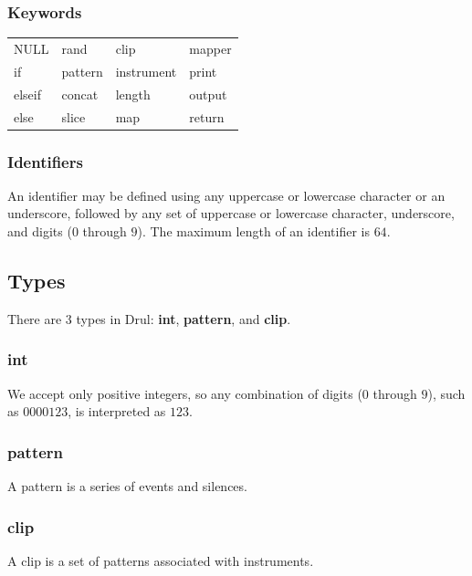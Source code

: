 \documentclass[11pt,twoside]{article}
\begin{document}
\subsubsection{Keywords}


\begin{table}[htb]
\begin{center} 
\begin{tabular}{llll} 
  NULL &    rand &    clip &        mapper \\
  if &      pattern & instrument &  print \\
  elseif &  concat &  length &      output \\
  else &    slice &   map &         return
\end{tabular}
\label{tab:keywords}
\end{center} 
\end{table}


\subsubsection{Identifiers}
An identifier may be defined using any uppercase or lowercase character
or an underscore, followed by any set of uppercase or lowercase character,
underscore, and digits ($0$ through $9$). The maximum length of an identifier
is $64$.

\subsection{Types}

There are $3$ types in Drul: \textbf{int}, \textbf{pattern},
and \textbf{clip}.

\subsubsection{int}
We accept only positive integers, so any combination of digits
($0$ through $9$), such as $0000123$,  is interpreted as $123$.

\subsubsection{pattern}
A pattern is a series of events and silences.


\subsubsection{clip}
A clip is a set of patterns associated with instruments.
\end{document}
